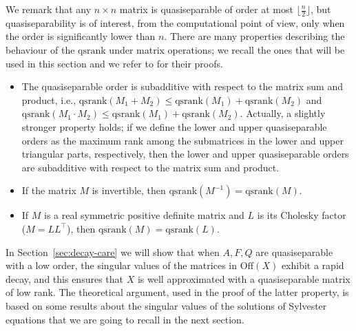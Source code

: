 \documentclass[a4paper,10pt]{article}
\def\qsrank{\mathrm{qsrank}}
\begin{document}
We remark that any $n\times n$ matrix is quasiseparable of order at most $\lfloor\frac{n}{2}\rfloor$, but quasiseparability is of interest, from the computational point of view, only when the order is significantly lower than $n$. There are many properties describing the behaviour of the $\qsrank$ under matrix operations; we recall the ones that will be used in this section and we refer to \cite{vandebril08} for their proofs.
\begin{itemize}
	\item The quasiseparable order is subadditive with respect to the matrix sum and product, i.e., $\qsrank(M_1+M_2)\le \qsrank(M_1)+\qsrank(M_2)$ and $\qsrank(M_1\cdot M_2)\le \qsrank(M_1)+\qsrank(M_2)$. Actually, a slightly stronger property holds; if we define the lower and upper quasiseparable orders as the maximum rank among the submatrices in the lower and upper triangular parts, respectively, then the lower and upper quasiseparable orders are subadditive with respect to the matrix sum and product.
	\item If the matrix $M$ is invertible, then $\qsrank(M^{-1})=\qsrank(M)$.
		\item If $M$ is a real symmetric positive definite matrix and $L$ is its Cholesky factor ($M=LL^\top$), then $\qsrank(M)=\qsrank(L)$.
\end{itemize}
In Section~\ref{sec:decay-care} we will show that when $A,F,Q$ are quasiseparable with a low order, the singular values of the matrices in $\mathrm{Off}(X)$ exhibit a rapid decay, and this ensures that $X$ is well approximated with a quasiseparable matrix of low rank. The theoretical argument, used in the proof of the latter property, is based on some results about the singular values of the solutions of Sylvester equations that we are going to recall in the next section.
\end{document}
